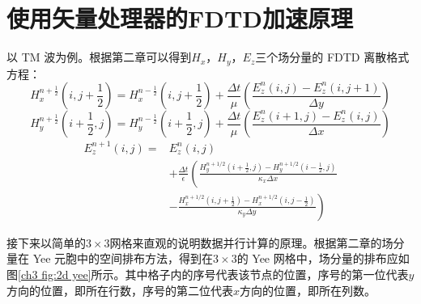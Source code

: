 \section{使用矢量处理器的FDTD加速原理}

以 TM 波为例。根据第二章可以得到$H_x$，$H_y$，$E_z$三个场分量的 FDTD 离散格式方程：
\begin{equation}\label{ch3: hx}
H^{n+\frac{1}{2}}_{x}\left(i,j+\frac{1}{2}\right)=H^{n-\frac{1}{2}}_{x}\left(i,j+\frac{1}{2}\right)+
\frac{\Delta t}{\mu}\left(
\frac{E^n_z(i,j)-E^n_z(i,j+1)}{\Delta y}
\right)
\end{equation}
\begin{equation}
H^{n+\frac{1}{2}}_{y}\left(i+\frac{1}{2},j\right)=H^{n-\frac{1}{2}}_{y}\left(i+\frac{1}{2},j\right)+
\frac{\Delta t}{\mu}\left(
\frac{E^n_z(i+1,j)-E^n_z(i,j)}{\Delta x}
\right)
\end{equation}
\begin{equation}\label{ch3: ez}
\begin{split}
E^{n+1}_z(i,j)=&E_z^n(i,j)\\
&+\frac{\Delta t}{\epsilon}\left(
\frac{H_y^{n+1/2}(i+\frac{1}{2},j)-H_y^{n+1/2}(i-\frac{1}{2},j)}{\kappa_x \Delta x}\right.\\
&\left.-\frac{H_x^{n+1/2}(i,j+\frac{1}{2})-H_x^{n+1/2}(i,j-\frac{1}{2})}{\kappa_y \Delta y}
\right)
\end{split}
\end{equation}

接下来以简单的$3\times3$网格来直观的说明数据并行计算的原理。根据第二章的场分量在 Yee 元胞中的空间排布方法，得到在$3\times3$的 Yee 网格中，场分量的排布应如图\ref{ch3 fig:2d yee}所示。其中格子内的序号代表该节点的位置，序号的第一位代表$y$方向的位置，即所在行数，序号的第二位代表$x$方向的位置，即所在列数。

